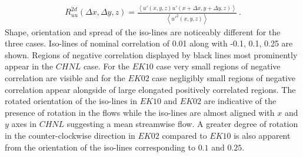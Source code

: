 \documentclass{amsart}
\begin{document}
\begin{align}
 R_{uu}^{2d}(\Delta x, \Delta y, z)=\frac{\left < u'(x, y, z)u'(x+ \Delta x, y + \Delta y, z) \right >}{\left < u'^{2}(x,y,z)\right >} \ .
 \label{eqn:2d_corr}
\end{align}
Shape, orientation and spread of the iso-lines are noticeably different for the three cases. Iso-lines of nominal correlation of 0.01 along with -0.1, 0.1, 0.25 are shown. Regions of negative correlation displayed by black lines most prominently appear in  the $CHNL$ case. For the $EK10$ case very small regions of negative correlation are visible and for the $EK02$ case negligibly small regions of negative correlation  appear alongside of large elongated positively correlated regions. The rotated orientation of the iso-lines in $EK10$ and $EK02$ are indicative of the presence of rotation in the flows while the iso-lines are almost aligned with $x$ and $y$ axes in $CHNL$  suggesting  a mean streamwise flow. A greater degree of rotation in the counter-clockwise direction in $EK02$ compared to $EK10$ is also apparent from the orientation of the iso-lines corresponding to $0.1$ and $0.25$.  
\graphicspath{{chap1Img/}}
\end{document}
